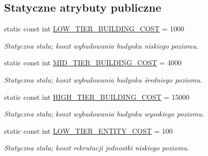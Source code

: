 \subsection*{Statyczne atrybuty publiczne}
\begin{DoxyCompactItemize}
\item 
\mbox{\label{classmodel_1_1Castle_a33917ec4ec233ca0155ef1bb1e6e71c3}} 
static const int \hyperlink{classmodel_1_1Castle_a33917ec4ec233ca0155ef1bb1e6e71c3}{L\+O\+W\+\_\+\+T\+I\+E\+R\+\_\+\+B\+U\+I\+L\+D\+I\+N\+G\+\_\+\+C\+O\+ST} = 1000
\begin{DoxyCompactList}\small\item\em Statyczna stała; koszt wybudowania budynku niskiego poziomu. \end{DoxyCompactList}\item 
\mbox{\label{classmodel_1_1Castle_a097c1b13b5b2963e40ad22c38fbc2702}} 
static const int \hyperlink{classmodel_1_1Castle_a097c1b13b5b2963e40ad22c38fbc2702}{M\+I\+D\+\_\+\+T\+I\+E\+R\+\_\+\+B\+U\+I\+L\+D\+I\+N\+G\+\_\+\+C\+O\+ST} = 4000
\begin{DoxyCompactList}\small\item\em Statyczna stała; koszt wybudowania budynku średniego poziomu. \end{DoxyCompactList}\item 
\mbox{\label{classmodel_1_1Castle_a35ec993e948dc5514f248beba9dcd27c}} 
static const int \hyperlink{classmodel_1_1Castle_a35ec993e948dc5514f248beba9dcd27c}{H\+I\+G\+H\+\_\+\+T\+I\+E\+R\+\_\+\+B\+U\+I\+L\+D\+I\+N\+G\+\_\+\+C\+O\+ST} = 15000
\begin{DoxyCompactList}\small\item\em Statyczna stała; koszt wybudowania budynku wysokiego poziomu. \end{DoxyCompactList}\item 
\mbox{\label{classmodel_1_1Castle_ac5c4d0b65b66c7058a87eecf4b712b78}} 
static const int \hyperlink{classmodel_1_1Castle_ac5c4d0b65b66c7058a87eecf4b712b78}{L\+O\+W\+\_\+\+T\+I\+E\+R\+\_\+\+E\+N\+T\+I\+T\+Y\+\_\+\+C\+O\+ST} = 100
\begin{DoxyCompactList}\small\item\em Statyczna stała; koszt rekrutacji jednostki niskiego poziomu. \end{DoxyCompactList}\item 

\end{DoxyCompactItemize}
